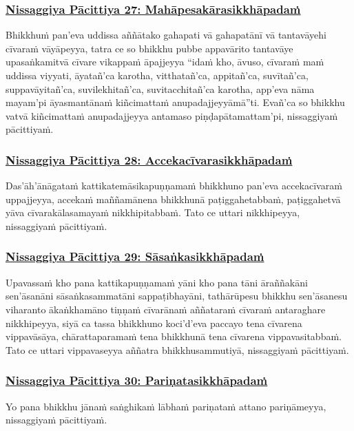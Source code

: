 \subsubsection*{\hyperref[forf-exp27]{Nissaggiya Pācittiya 27: Mahāpesakārasikkhāpadaṁ}}
\label{np27}
Bhikkhuṁ pan'eva uddissa aññātako gahapati vā gahapatānī vā tantavāyehi cīvaraṁ vāyāpeyya, tatra ce so bhikkhu pubbe appavārito tantavāye upasaṅkamitvā cīvare vikappaṁ āpajjeyya “idaṁ kho, āvuso, cīvaraṁ maṁ uddissa viyyati, āyatañ'ca karotha, vitthatañ'ca, appitañ'ca, suvītañ'ca, suppavāyitañ'ca, suvilekhitañ'ca, suvitacchitañ'ca karotha, app'eva nāma mayam'pi āyasmantānaṁ kiñcimattaṁ anupadajjeyyāmā”ti. Evañ'ca so bhikkhu vatvā kiñcimattaṁ anupadajjeyya antamaso piṇḍapātamattam'pi, nissaggiyaṁ pācittiyaṁ.

\subsubsection*{\hyperref[forf-exp28]{Nissaggiya Pācittiya 28: Accekacīvarasikkhāpadaṁ}}
\label{np28}
Das'āh'ānāgataṁ kattikatemāsikapuṇṇamaṁ bhikkhuno pan'eva accekacīvaraṁ uppajjeyya, accekaṁ maññamānena bhikkhunā paṭiggahetabbaṁ, paṭiggahetvā yāva cīvarakālasamayaṁ nikkhipitabbaṁ. Tato ce uttari nikkhipeyya, nissaggiyaṁ pācittiyaṁ.

\subsubsection*{\hyperref[forf-exp29]{Nissaggiya Pācittiya 29: Sāsaṅkasikkhāpadaṁ}}
\label{np29}
Upavassaṁ kho pana kattikapuṇṇamaṁ yāni kho pana tāni āraññakāni sen'āsanāni sāsaṅkasammatāni sappaṭibhayāni, tathārūpesu bhikkhu sen'āsanesu viharanto ākaṅkhamāno tiṇṇaṁ cīvarānaṁ aññataraṁ cīvaraṁ antaraghare nikkhipeyya, siyā ca tassa bhikkhuno koci'd'eva paccayo tena cīvarena vippavāsāya, chārattaparamaṁ tena bhikkhunā tena cīvarena vippavasitabbaṁ. Tato ce uttari vippavaseyya aññatra bhikkhusammutiyā, nissaggiyaṁ pācittiyaṁ.

\subsubsection*{\hyperref[forf-exp30]{Nissaggiya Pācittiya 30: Pariṇatasikkhāpadaṁ}}
\label{np30}
Yo pana bhikkhu jānaṁ saṅghikaṁ lābhaṁ pariṇataṁ attano pariṇāmeyya, nissaggiyaṁ pācittiyaṁ.

